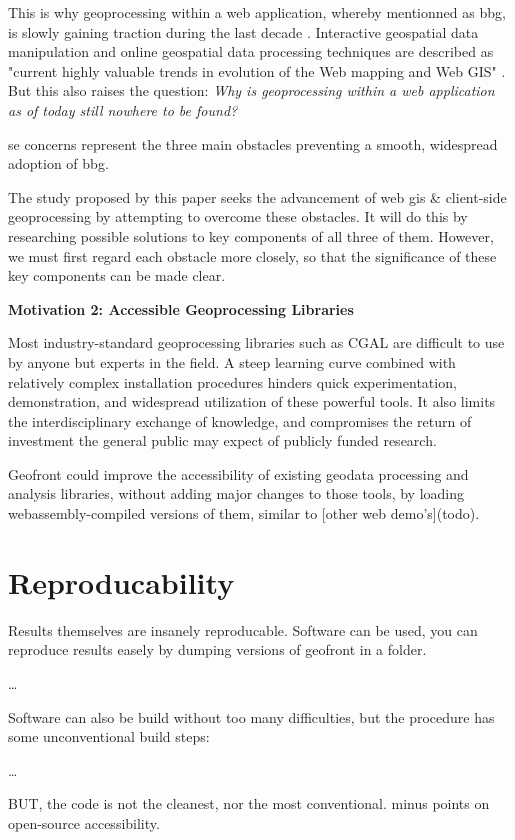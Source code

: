   This is why \ac{geoprocessing} within a web application, whereby mentionned as \ac{bbg}, is slowly gaining traction during the last decade \cite{kulawiak_analysis_2019, panidi_hybrid_2015, hamilton_client-side_2014}. Interactive geospatial data manipulation and online geospatial data processing techniques are described as "current highly valuable trends in evolution of the Web mapping and Web GIS" \cite{panidi_hybrid_2015}. But this also raises the question: \textit{Why is geoprocessing within a web application as of today still nowhere to be found?} 
  
  se concerns represent the three main obstacles preventing a smooth, widespread adoption of \ac{bbg}. 
  
  The study proposed by this paper seeks the advancement of web \ac{gis} \& client-side geoprocessing by attempting to overcome these obstacles. It will do this by researching possible solutions to key components of all three of them. However, we must first regard each obstacle more closely, so that the significance of these key components can be made clear. 
  
  \textbf{Motivation 2: Accessible Geoprocessing Libraries}
  
  Most industry-standard geoprocessing libraries such as CGAL are difficult to use by anyone but experts in the field. A steep learning curve combined with relatively complex installation procedures hinders quick experimentation, demonstration, and widespread utilization of these powerful tools. It also limits the interdisciplinary exchange of knowledge, and compromises the return of investment the general public may expect of publicly funded research.
  
  Geofront could improve the accessibility of existing geodata processing and analysis libraries, without adding major changes to those tools, by loading webassembly-compiled versions of them, similar to [other web demo's](todo).
  





\section{Reproducability}

Results themselves are insanely reproducable.
Software can be used, you can reproduce results easely by dumping versions of geofront in 
a folder.

\dots

Software can also be build without too many difficulties, but the procedure has some unconventional build steps: 

\dots

BUT, the code is not the cleanest, nor the most conventional. minus points on open-source accessibility.

